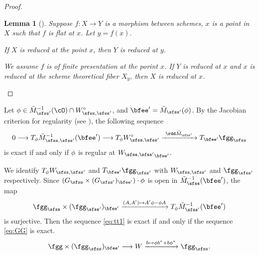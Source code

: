 \documentclass[12pt,a4paper]{amsart}
\numberwithin{equation}{section}
\newtheorem{lem}[thm]{Lemma}
\theoremstyle{remark}
\begin{document}
\begin{proof}
{\begin{lem}[{\cite[Proposition~11.3.13]{EGAIV3}}] \label{lem:red}
  Suppose $f\colon X\rightarrow Y$ is a morphism between schemes, $x$ is a point
  in $X$ such that $f$ is flat at $x$. Let $y=f(x)$.
  \begin{enuma}
    \item  If $X$ is reduced at the point $x$, then $Y$ is reduced at $y$.
    \item We assume $f$ is of finite presentation at the porint $x$.
    If $Y$ is reduced at $x$ and $x$ is reduced at the scheme theoretical fiber
    $X_{y}$, then $X$ is reduced at $x$.
  \end{enuma}
\end{lem}

}
\end{proof}


Let $\ww\in \CMsp^{{-1}}(\cO)\cap \Woss$, and $\Xp = \CMsp(\ww)$.
By the Jacobian criterion for
regularity (see \cite[Theorem~2.19]{LiuAG}), the following sequence
\begin{equation}\label{eq:tt1}
  0\longrightarrow T_{\ww} \CMss^{{-1}}(\Xp) \longrightarrow T_{\ww} \Woss
  \xrightarrow{\ \rdd \CMsp \ } T_{\Xp}\fggs
\end{equation}
is exact if and only if $\phi$ is regular at $\Wss_{\Xp}$.

We identify  $T_{\ww}\Wss$ and $T_{\Xp}\fggsp$ with $\Wss$ and $\fggsp$
respectively. Since $(\Gs\times (\Gsp)_{\Xp})\cdot \ww$ is open in $\CMs^{{-1}}(\Xp)$,
the map
\[
  \fggs\times (\fggsp)_{\Xp}\xrightarrow{(A,A')\mapsto A'\ww - \ww A} T_{\ww}\CMsp^{-1}(\Xp)
\]
is surjective.
Then the sequence \eqref{eq:tt1}
is exact if and only if the sequence \eqref{eq:GG} is exact.
\begin{equation}\label{eq:GG}
  \fgg\times(\fggs)_{\Xp} \longrightarrow W
  \xrightarrow{b\mapsto \ww b^{*} + b\ww^{*} } \fggs.
\end{equation}
\end{document}
